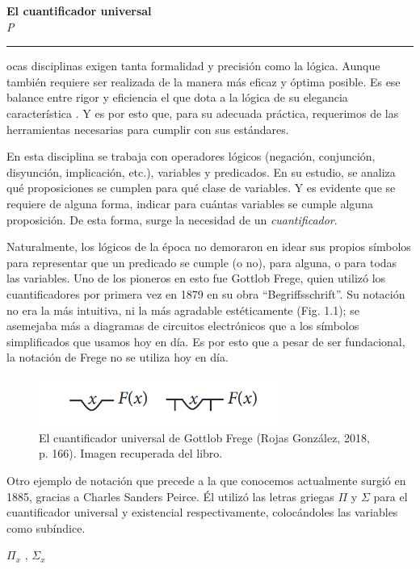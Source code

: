 \documentclass[11pt, a4paper]{article}
\newcommand{\ensayoTitulo}[2]{%
  \begin{center}
    \vspace*{1cm}
    {\fontsize{36}{38}\selectfont\textbf{#1}} \\
    \vspace{0.4cm}
    {\fontsize{18}{20}\selectfont\textit{#2}}
    \vspace*{1.5cm}
    \hrule
    \vspace*{0.3cm}
  \end{center}
}
\begin{document}
\ensayoTitulo{El cuantificador universal}

Pocas disciplinas exigen tanta formalidad y precisión como la lógica. Aunque también requiere ser realizada de la manera más eficaz y óptima posible. Es ese balance entre rigor y eficiencia el que dota a la lógica de su elegancia característica . Y es por esto que, para su adecuada práctica,  requerimos de las herramientas necesarias para cumplir con sus estándares. 

En esta disciplina se trabaja con operadores lógicos (negación, conjunción, disyunción, implicación, etc.), variables y  predicados. En su estudio, se analiza qué proposiciones se cumplen para qué clase de variables. Y es evidente que se requiere de alguna forma, indicar para cuántas  variables se cumple alguna proposición. De esta forma, surge la necesidad de un \emph{cuantificador}. 

Naturalmente, los lógicos de la época no demoraron en idear sus propios símbolos para representar que un predicado se cumple (o no), para alguna, o para todas las variables. 
Uno de los pioneros en esto fue Gottlob Frege, quien utilizó los cuantificadores por primera vez en 1879 en su obra “Begriffsschrift”.  Su notación no era la más intuitiva, ni la más agradable estéticamente (Fig. 1.1); se asemejaba más a diagramas de circuitos electrónicos que a los símbolos simplificados que usamos hoy en día. Es por esto que a pesar de ser fundacional, la notación de Frege no se utiliza hoy en día. 

\begin{figure}[H]
    \centering
    \includegraphics[width=0.7\textwidth]{cuantificador_frege.png}
    \caption{El cuantificador universal de Gottlob Frege (Rojas González, 2018, p. 166). Imagen recuperada del libro.}
    \label{fig:frege}
\end{figure}

Otro ejemplo de notación que precede a la que conocemos actualmente surgió en 1885, gracias a Charles Sanders Peirce. Él utilizó las letras griegas $\varPi$ y $\varSigma$ para el cuantificador universal y existencial respectivamente, colocándoles las variables como subíndice. 

\begin{center}
$\varPi_x$ , $\varSigma_x$
\end{center}
\end{document}
